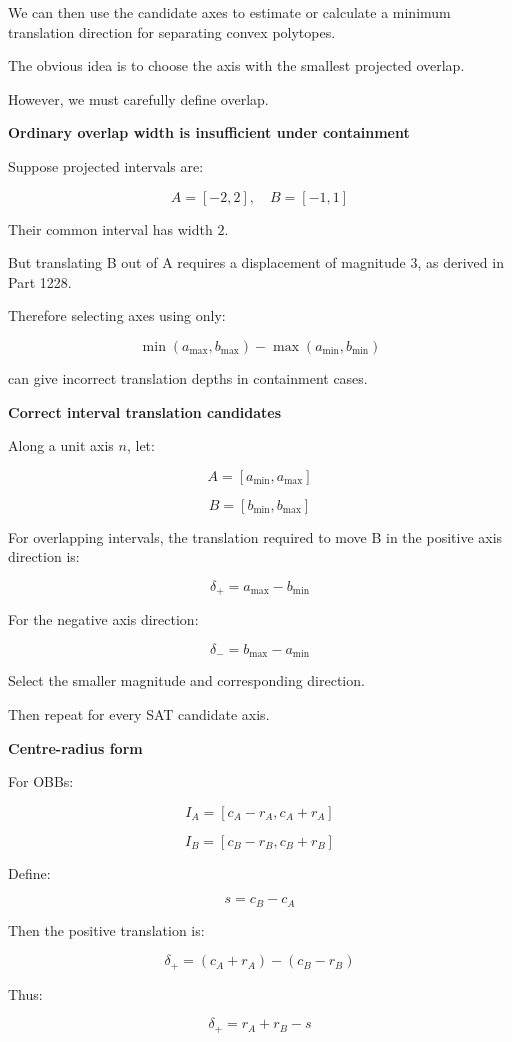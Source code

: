 We can then use the candidate axes to estimate or calculate a minimum translation direction for separating convex polytopes.

The obvious idea is to choose the axis with the smallest projected overlap.

However, we must carefully define overlap.

\textbf{Ordinary overlap width is insufficient under containment}

Suppose projected intervals are:

\[
A=[-2,2],\quad B=[-1,1]
\]

Their common interval has width \(2\).

But translating B out of A requires a displacement of magnitude \(3\), as derived in Part 1228.

Therefore selecting axes using only:

\[
\min(a_{\max},b_{\max})- \max(a_{\min},b_{\min})
\]

can give incorrect translation depths in containment cases.

\textbf{Correct interval translation candidates}

Along a unit axis \(n\), let:

\[
A=[a_{\min},a_{\max}]
\]

\[
B=[b_{\min},b_{\max}]
\]

For overlapping intervals, the translation required to move B in the positive axis direction is:

\[
\boxed{ \delta_+=a_{\max}-b_{\min} }
\]

For the negative axis direction:

\[
\boxed{ \delta_-=b_{\max}-a_{\min} }
\]

Select the smaller magnitude and corresponding direction.

Then repeat for every SAT candidate axis.

\textbf{Centre-radius form}

For OBBs:

\[
I_A=[c_A-r_A,c_A+r_A]
\]

\[
I_B=[c_B-r_B,c_B+r_B]
\]

Define:

\[
s=c_B-c_A
\]

Then the positive translation is:

\[
\delta_+ = (c_A+r_A)-(c_B-r_B)
\]

Thus:

\[
\boxed{ \delta_+=r_A+r_B-s }
\]

